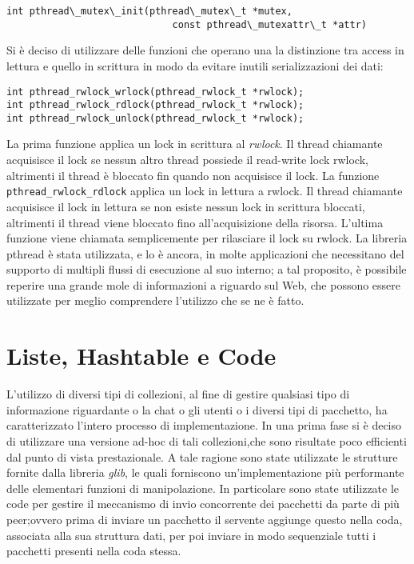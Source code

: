 \begin{lstlisting}
int pthread\_mutex\_init(pthread\_mutex\_t *mutex,
                             const pthread\_mutexattr\_t *attr)
\end{lstlisting}
Si è deciso di utilizzare delle funzioni che operano una la distinzione tra access in lettura e quello in scrittura in modo da evitare inutili serializzazioni dei dati:
\begin{lstlisting}
int pthread_rwlock_wrlock(pthread_rwlock_t *rwlock);
int pthread_rwlock_rdlock(pthread_rwlock_t *rwlock);
int pthread_rwlock_unlock(pthread_rwlock_t *rwlock);
\end{lstlisting}
La prima funzione applica un lock in scrittura al \textit{rwlock}. Il thread chiamante acquisisce il lock se nessun altro thread possiede il read-write lock rwlock, altrimenti il thread è bloccato fin quando non acquisisce il lock. La funzione \texttt{pthread\_rwlock\_rdlock} applica un lock in lettura a rwlock. Il thread chiamante acquisisce il lock in lettura se non esiste nessun lock in scrittura bloccati, altrimenti il thread viene bloccato fino all’acquisizione della risorsa. L’ultima funzione viene chiamata semplicemente per rilasciare il lock su rwlock.
La libreria pthread è stata utilizzata, e lo è ancora, in molte applicazioni che necessitano del supporto di multipli flussi di esecuzione al suo interno; a tal proposito, è possibile reperire una grande mole di informazioni a riguardo sul Web, che possono essere utilizzate per meglio comprendere l’utilizzo che se ne è fatto.
\section{Liste, Hashtable e Code}
L'utilizzo di diversi tipi di collezioni, al fine di gestire qualsiasi tipo di informazione riguardante o la chat o gli utenti o i diversi tipi di pacchetto, ha caratterizzato l'intero processo di implementazione.
In una prima fase si è deciso di utilizzare una versione ad-hoc di tali collezioni,che sono risultate poco efficienti dal punto di vista prestazionale. A tale ragione sono state utilizzate le strutture fornite dalla libreria \textit{glib}, le quali forniscono un'implementazione più performante delle elementari funzioni di manipolazione.
In particolare sono state utilizzate le code per gestire il meccanismo di invio concorrente dei pacchetti da parte di più peer;ovvero prima di inviare un pacchetto il servente aggiunge questo nella coda, associata alla sua struttura dati, per poi inviare in modo sequenziale tutti i pacchetti presenti nella coda stessa.
